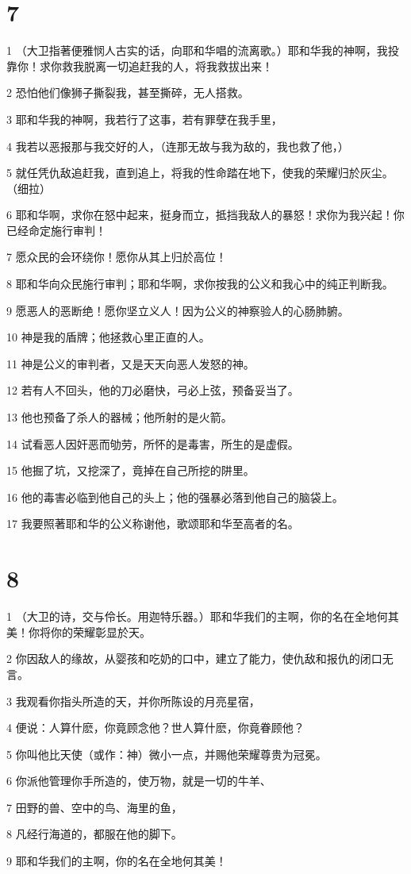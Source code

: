 \chapter{7}

\par 1 （大卫指著便雅悯人古实的话，向耶和华唱的流离歌。）耶和华我的神啊，我投靠你！求你救我脱离一切追赶我的人，将我救拔出来！
\par 2 恐怕他们像狮子撕裂我，甚至撕碎，无人搭救。
\par 3 耶和华我的神啊，我若行了这事，若有罪孽在我手里，
\par 4 我若以恶报那与我交好的人，（连那无故与我为敌的，我也救了他，）
\par 5 就任凭仇敌追赶我，直到追上，将我的性命踏在地下，使我的荣耀归於灰尘。（细拉）
\par 6 耶和华啊，求你在怒中起来，挺身而立，抵挡我敌人的暴怒！求你为我兴起！你已经命定施行审判！
\par 7 愿众民的会环绕你！愿你从其上归於高位！
\par 8 耶和华向众民施行审判；耶和华啊，求你按我的公义和我心中的纯正判断我。
\par 9 愿恶人的恶断绝！愿你坚立义人！因为公义的神察验人的心肠肺腑。
\par 10 神是我的盾牌；他拯救心里正直的人。
\par 11 神是公义的审判者，又是天天向恶人发怒的神。
\par 12 若有人不回头，他的刀必磨快，弓必上弦，预备妥当了。
\par 13 他也预备了杀人的器械；他所射的是火箭。
\par 14 试看恶人因奸恶而劬劳，所怀的是毒害，所生的是虚假。
\par 15 他掘了坑，又挖深了，竟掉在自己所挖的阱里。
\par 16 他的毒害必临到他自己的头上；他的强暴必落到他自己的脑袋上。
\par 17 我要照著耶和华的公义称谢他，歌颂耶和华至高者的名。

\chapter{8}

\par 1 （大卫的诗，交与伶长。用迦特乐器。）耶和华我们的主啊，你的名在全地何其美！你将你的荣耀彰显於天。
\par 2 你因敌人的缘故，从婴孩和吃奶的口中，建立了能力，使仇敌和报仇的闭口无言。
\par 3 我观看你指头所造的天，并你所陈设的月亮星宿，
\par 4 便说：人算什麽，你竟顾念他？世人算什麽，你竟眷顾他？
\par 5 你叫他比天使（或作：神）微小一点，并赐他荣耀尊贵为冠冕。
\par 6 你派他管理你手所造的，使万物，就是一切的牛羊、
\par 7 田野的兽、空中的鸟、海里的鱼，
\par 8 凡经行海道的，都服在他的脚下。
\par 9 耶和华我们的主啊，你的名在全地何其美！

